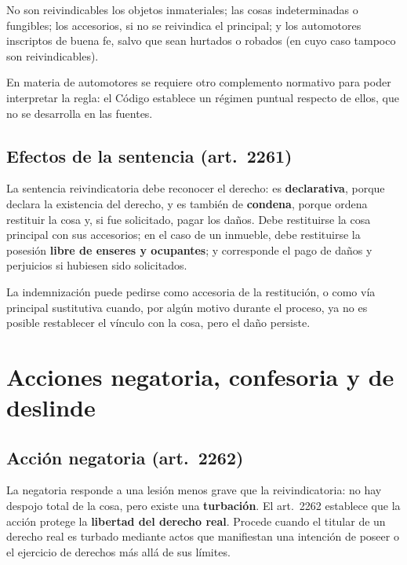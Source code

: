 \documentclass[12pt,oneside]{book}
\begin{document}
No son reivindicables los objetos inmateriales; las cosas indeterminadas o fungibles; los accesorios, si no se reivindica el principal; y los automotores inscriptos de buena fe, salvo que sean hurtados o robados (en cuyo caso tampoco son reivindicables).

\begin{nota}
En materia de automotores se requiere otro complemento normativo para poder interpretar la regla: el Código establece un régimen puntual respecto de ellos, que no se desarrolla en las fuentes.
\end{nota}

\subsection{Efectos de la sentencia (art.~2261)}

La sentencia reivindicatoria debe reconocer el derecho: es \textbf{declarativa}, porque declara la existencia del derecho, y es también de \textbf{condena}, porque ordena restituir la cosa y, si fue solicitado, pagar los daños. Debe restituirse la cosa principal con sus accesorios; en el caso de un inmueble, debe restituirse la posesión \textbf{libre de enseres y ocupantes}; y corresponde el pago de daños y perjuicios si hubiesen sido solicitados.

\begin{importante}
La indemnización puede pedirse como accesoria de la restitución, o como vía principal sustitutiva cuando, por algún motivo durante el proceso, ya no es posible restablecer el vínculo con la cosa, pero el daño persiste.
\end{importante}

\section{Acciones negatoria, confesoria y de deslinde}

\subsection{Acción negatoria (art.~2262)}

La negatoria responde a una lesión menos grave que la reivindicatoria: no hay despojo total de la cosa, pero existe una \textbf{turbación}. El art.~2262 establece que la acción protege la \textbf{libertad del derecho real}. Procede cuando el titular de un derecho real es turbado mediante actos que manifiestan una intención de poseer o el ejercicio de derechos más allá de sus límites.
\end{document}
